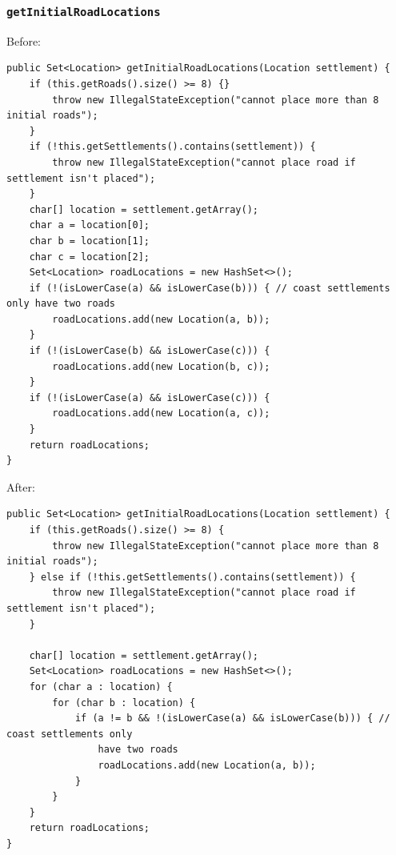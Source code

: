\documentclass{fank1basedocument}
\begin{document}
\subsubsection*{\texttt{getInitialRoadLocations}}
Before:
\begin{lstlisting}[style=javacode,language=myJava]
public Set<Location> getInitialRoadLocations(Location settlement) {
	if (this.getRoads().size() >= 8) {}
		throw new IllegalStateException("cannot place more than 8 initial roads");
	}
	if (!this.getSettlements().contains(settlement)) {
		throw new IllegalStateException("cannot place road if settlement isn't placed");
	}
	char[] location = settlement.getArray();
	char a = location[0];
	char b = location[1];
	char c = location[2];
	Set<Location> roadLocations = new HashSet<>();
	if (!(isLowerCase(a) && isLowerCase(b))) { // coast settlements only have two roads
		roadLocations.add(new Location(a, b));
	}
	if (!(isLowerCase(b) && isLowerCase(c))) {
		roadLocations.add(new Location(b, c));
	}
	if (!(isLowerCase(a) && isLowerCase(c))) {
		roadLocations.add(new Location(a, c));
	}
	return roadLocations;
}
\end{lstlisting}
After:
\begin{lstlisting}[style=javacode,language=myJava]
public Set<Location> getInitialRoadLocations(Location settlement) {
	if (this.getRoads().size() >= 8) {
		throw new IllegalStateException("cannot place more than 8 initial roads");
	} else if (!this.getSettlements().contains(settlement)) {
		throw new IllegalStateException("cannot place road if settlement isn't placed");
	}

	char[] location = settlement.getArray();
	Set<Location> roadLocations = new HashSet<>();
	for (char a : location) {
		for (char b : location) {
			if (a != b && !(isLowerCase(a) && isLowerCase(b))) { // coast settlements only 
				have two roads
				roadLocations.add(new Location(a, b));
			}
		}
	}
	return roadLocations;
}
\end{lstlisting}
\end{document}
